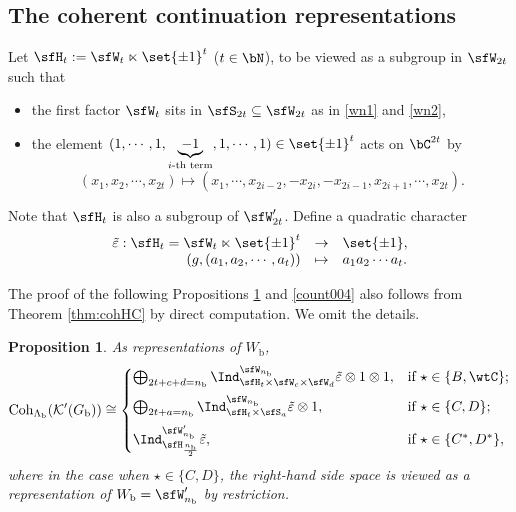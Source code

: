 \documentclass[12pt]{amsart}
\newcommand{\Res}{\mathrm{Res}}
\def\subset{\subseteq}
\newcommand{\CK}{{\mathcal {K}}}
\numberwithin{equation}{section}
\newtheorem{prop}[thm]{Proposition}
\theoremstyle{remark}
\def\Coh{\mathrm{Coh}}
\begin{document}
\subsection{The coherent continuation representations}
 Let
$\sfH_{t} := \sfW_t\ltimes \set{\pm 1}^t$ ($t\in\bN$), to be viewed as a  subgroup in $\sfW_{2t}$ such
that
\begin{itemize}
  \item the first factor $\sfW_{t}$ sits in $\sfS_{2t}\subset \sfW_{2t}$ as in \eqref{wn1} and \eqref{wn2},
    \item the element $(1,\cdots,1, \underbrace{-1}_{i\text{-th
        term}}, 1, \cdots, 1)\in \set{\pm 1}^{t}$ acts on $\bC^{2t}$ by
        \[
        (x_{1},x_{2},\cdots, x_{2t} ) \mapsto (x_{1},\cdots, x_{2i-2}, -x_{2i},-x_{2i-1},x_{2i+1},\cdots, x_{2t}).
        \]
\end{itemize}
Note that $\sfH_{t}$ is also a subgroup of $\sfW'_{2t}$. Define a quadratic
character
\[
  \begin{array}{rcl}
    \tilde{\varepsilon} :  \sfH_{t}=  \sfW_{t}\ltimes \set{\pm 1}^{t}& \rightarrow & \set{\pm 1},\\
                                  (g,(a_{1},a_{2},\cdots, a_{t})) & \mapsto & a_{1}a_{2}\cdots a_{t}.
  \end{array}
\]







     The proof of the following Propositions \ref{count003} and \ref{count004}  also follows from Theorem \ref{thm:cohHC} by direct computation. We  omit the details.




\begin{prop}\label{count003}
As representations of $W_\mathrm b$,
    \[
       \Coh_{\Lambda_\mathrm b}(\CK'(G_\mathrm b)) \cong
        \begin{cases}
  \bigoplus_{\substack{2t+c+d=n_\mathrm b}} \Ind_{\sfH_{t} \times \sfW_{c}\times \sfW_{d}}^{\sfW_{n_\mathrm b}}
         \tilde{\varepsilon}\otimes 1\otimes 1, &  \text{if $\star \in \{B,  \wtC \}$}; \medskip\\
      \bigoplus_{\substack{2t+a=n_\mathrm b}} %
          \Ind_{\sfH_{t} \times \sfS_a}^{\sfW_{n_\mathrm b}}\tilde{\varepsilon}\otimes 1, &  \text{if $\star \in \{C, D \}$};\medskip \\
          \Ind_{\sfH_{\frac{n_\mathrm b}{2}}}^{\sfW'_{n_\mathrm b}}\tilde{\varepsilon}, &  \text{if $\star \in \{C^*, D^* \}$},
     \end{cases}
       \]
       where in the case when $\star\in \{C,D\}$, the right-hand side space is viewed as a representation of $W_\mathrm b=\sfW_{n_\mathrm b}'$ by restriction.
      \end{prop}
\end{document}
